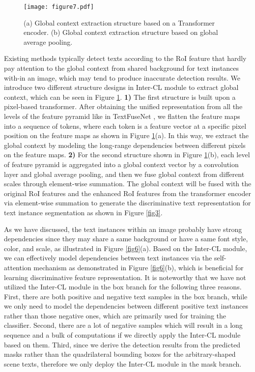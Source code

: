 \begin{figure}[t]
  \centering
  \texttt{[image: figure7.pdf]}
  \caption{(a) Global context extraction structure based on a Transformer encoder. (b) Global context extraction structure based on global average pooling.}
  \label{fig7}
\end{figure}

Existing methods typically detect texts according to the RoI feature that hardly pay attention to the global context from shared background for text instances with-in an image, which may tend to produce inaccurate detection results. We introduce two different structure designs in Inter-CL module to extract global context, which can be seen in Figure \ref{fig7}. \textbf{1)} The first structure is built upon a pixel-based transformer. After obtaining the unified representation from all the levels of the feature pyramid like in TextFuseNet \citep{textfusenet}, we flatten the feature maps into a sequence of tokens, where each token is a feature vector at a specific pixel position on the feature maps as shown in Figure \ref{fig7}(a). In this way, we extract the global context by modeling the long-range dependencies between different pixels on the feature maps. \textbf{2)} For the second structure shown in Figure \ref{fig7}(b), each level of feature pyramid is aggregated into a global context vector by a  convolution layer and global average pooling, and then we fuse global context from different scales through element-wise summation. The global context will be fused with the original RoI features and the enhanced RoI features from the transformer encoder via element-wise summation to generate the discriminative text representation for text instance segmentation as shown in Figure \ref{fig3}.

As we have discussed, the text instances within an image probably have strong dependencies since they may share a same background or have a same font style, color, and scale, as illustrated in Figure \ref{fig6}(a). Based on the Inter-CL module, we can effectively model dependencies between text instances via the self-attention mechanism as demonstrated in Figure \ref{fig6}(b), which is beneficial for learning discriminative feature representation. It is noteworthy that we have not utilized the Inter-CL module in the box branch for the following three reasons. First, there are both positive and negative text samples in the box branch, while we only need to model the dependencies between different positive text instances rather than those negative ones, which are primarily used for training the classifier. Second, there are a lot of negative samples which will result in a long sequence and a bulk of computations if we directly apply the Inter-CL module based on them. Third, since we derive the detection results from the predicted masks rather than the quadrilateral bounding boxes for the arbitrary-shaped scene texts, therefore we only deploy the Inter-CL module in the mask branch. 

